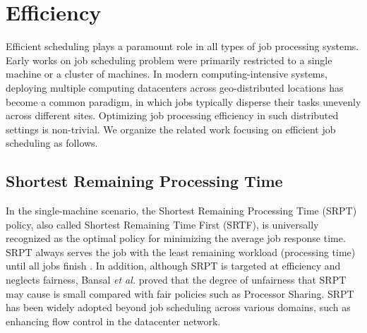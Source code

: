 

\section{Efficiency}
Efficient scheduling plays a paramount role in all types of job processing systems. Early works on job scheduling problem were primarily restricted to a single machine or a cluster of machines. In modern computing-intensive systems, deploying multiple computing datacenters across geo-distributed locations has become a common paradigm, in which jobs typically disperse their tasks unevenly across different sites. Optimizing job processing efficiency in such distributed settings is non-trivial. We organize the related work focusing on efficient job scheduling as follows.


\subsection{Shortest Remaining Processing Time}
In the single-machine scenario, the Shortest Remaining Processing Time (SRPT) policy, also called Shortest Remaining Time First (SRTF), is universally recognized as the optimal policy for minimizing the average job response time. SRPT always serves the job with the least remaining workload (processing time) until all jobs finish \cite{wiki:SRT, echrage1968proof}. In addition, although SRPT is targeted at efficiency and neglects fairness, Bansal \textit{et al.} \cite{bansal2001analysis} proved that the degree of unfairness that SRPT may cause is small compared with fair policies such as Processor Sharing. SRPT has been widely adopted beyond job scheduling across various domains, such as enhancing flow control \cite{gao2018d, wang2022approximate} in the datacenter network. %

